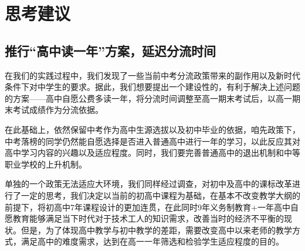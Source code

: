 \documentclass[12pt,UTF8]{ctexart}
\begin{document}
\newpage

\section {思考建议}
\subsection {推行“高中读一年”方案，延迟分流时间}
\par {
	
	在我们的实践过程中，我们发现了一些当前中考分流政策带来的副作用以及新时代条件下对中学生的要求。据此，我们想要提出一个建设性的，有利于解决上述问题的方案——高中自愿公费多读一年，将分流时间调整至高一期末考试后，以高一期末考试成绩作为分流依据。
}
\par {
	
	在此基础上，依然保留中考作为高中生源选拔以及初中毕业的依据，咱先政策下，中考落榜的同学仍然能自愿选择是否进入普通高中进行一年的学习，以此反应其对高中学习内容的兴趣以及适应程度。同时，我们要完善普通高中的退出机制和中等职业学校的上升机制。
}
\par {
	
	单独的一个政策无法适应大环境，我们同样经过调查，对初中及高中的课标改革进行了一定的思考，我们决定以当前的初高中课程为基础，在基本不改变教学大纲的前提下，将初高中7年课程设计的更加连贯，在此同时9年义务制教育+一年高中自愿教育能够满足当下时代对于技术工人的知识需求，改善当时的经济不平衡的现状。但是，为了体现高中教学与初中教学的差距，需要改变高中以来老师的教学方式，满足高中的难度需求，达到在高一一年筛选和检验学生适应程度的目的。
}
\end{document}
